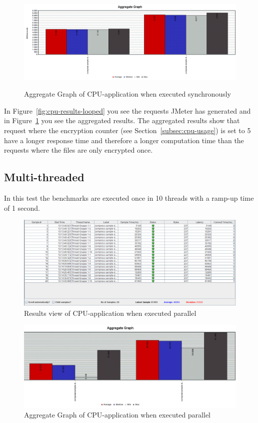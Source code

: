 \begin{figure}[!h]
  \caption{Aggregate Graph of CPU-application when executed synchronously}
  \centering
    \includegraphics[width=1\textwidth]{Screenshots/cpu-graph-looped}
    \label{fig:cpu-graph-looped}
\end{figure}

In Figure~\ref{fig:cpu-results-looped} you see the requests JMeter has generated and in Figure~\ref{fig:cpu-graph-looped} you see the aggregated results. The aggregated results show that request where the encryption counter (see Section~\ref{subsec:cpu-usage}) is set to 5 have a longer response time and therefore a longer computation time than the requests where the files are only encrypted once.


\subsection{Multi-threaded}
In this test the benchmarks are executed once in 10 threads with a ramp-up time of 1 second. 

\begin{figure}[!h]
  \caption{Results view of CPU-application when executed parallel}
  \centering
    \includegraphics[width=1\textwidth]{Screenshots/cpu-results-threaded}
\end{figure}

\begin{figure}[!h]
  \caption{Aggregate Graph of CPU-application when executed parallel}
  \centering
    \includegraphics[width=1\textwidth]{Screenshots/cpu-graph-threaded}
\end{figure}

